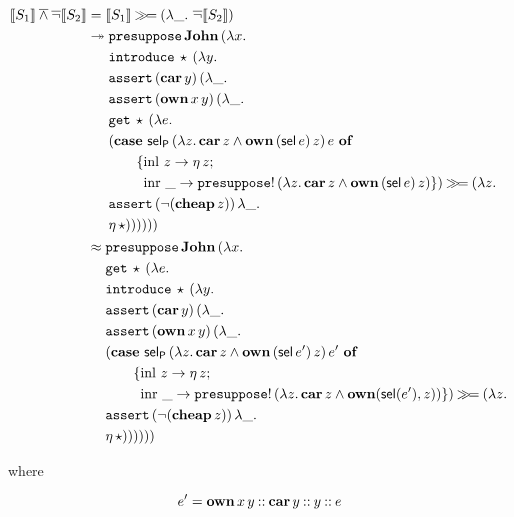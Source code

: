 \begin{align*}
  \llbracket S_1 \rrbracket \mathbin{\overline{\land}} \mathop{\overline{\lnot}} \llbracket S_2 \rrbracket
  &= \llbracket S_1 \rrbracket \mathbin{\gg\!=} (\lambda \_.\, \mathop{\overline{\lnot}} \llbracket S_2 \rrbracket) \\
  &\twoheadrightarrow \begin{aligned}[t]
      &\mathtt{presuppose}\,\textbf{John}\,(\lambda x.\,  \\
      &\mathtt{introduce}\,\star\,(\lambda y.\,  \\
      &\mathtt{assert}\,(\textbf{car}\,y)\,(\lambda \_.\,  \\
      &\mathtt{assert}\,(\textbf{own}\,x\,y)\,(\lambda \_.\,  \\
      &\mathtt{get}\,\star\,(\lambda e.\,  \\
      &(\text{\textbf{case} $\textsf{sel}_{\textsf{P}}\,(\lambda z.\, \textbf{car}\,z \land \textbf{own}\,(\textsf{sel}\,e)\,z)\,e$ \textbf{of}} \\ &\qquad \{\operatorname{inl}\,z \to \eta\,z; \\ &\qquad \ \operatorname{inr}\,\_ \to \mathtt{presuppose}!\,(\lambda z.\, \textbf{car}\,z \land \textbf{own}\,(\textsf{sel}\,e)\,z) \}) \mathbin{\gg\!=} (\lambda z.\,  \\
      &\mathtt{assert}\,(\lnot (\textbf{cheap}\,z))\,\lambda \_.\,  \\
      &\eta\,\star))))))
    \end{aligned} \\
  &\approx \begin{aligned}[t]
      &\mathtt{presuppose}\,\textbf{John}\,(\lambda x.\,  \\
      &\mathtt{get}\,\star\,(\lambda e.\,  \\
      &\mathtt{introduce}\,\star\,(\lambda y.\,  \\
      &\mathtt{assert}\,(\textbf{car}\,y)\,(\lambda \_.\,  \\
      &\mathtt{assert}\,(\textbf{own}\,x\,y)\,(\lambda \_.\,  \\
      &(\text{\textbf{case} $\textsf{sel}_{\textsf{P}}\,(\lambda z.\, \textbf{car}\,z \land \textbf{own}\,(\textsf{sel}\,e')\,z)\,e'$ \textbf{of}} \\ &\qquad \{\operatorname{inl}\,z \to \eta\,z; \\ &\qquad \ \operatorname{inr}\,\_ \to \mathtt{presuppose}!\,(\lambda z.\, \textbf{car}\,z \land \textbf{own}(\textsf{sel}(e'), z)) \}) \mathbin{\gg\!=} (\lambda z.\,  \\
      &\mathtt{assert}\,(\lnot (\textbf{cheap}\,z))\,\lambda \_.\,  \\
      &\eta\,\star))))))
    \end{aligned}
\end{align*}

where

$$
e' = \textbf{own}\,x\,y \mathbin{::} \textbf{car}\,y \mathbin{::} y \mathbin{::} e
$$


